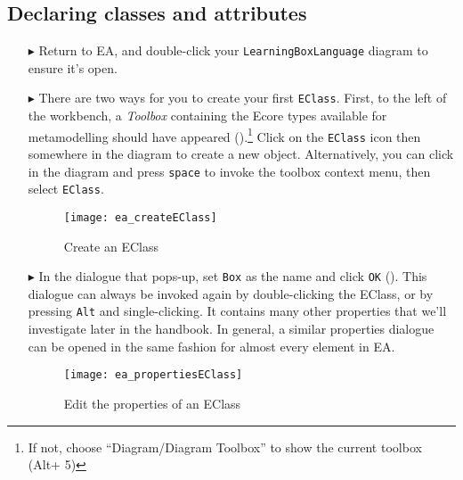 \newpage
\subsection{Declaring classes and attributes}
\genHeader
\hypertarget{static:classes vis}{}

\begin{itemize}

\item[$\blacktriangleright$] Return to EA, and double-click your \texttt{LearningBoxLanguage} diagram to ensure it's open.

\vspace{0.5cm}

\item[$\blacktriangleright$] There are two ways for you to create your first \texttt{EClass}. First, to the left of the workbench, a \emph{Toolbox} containing
the Ecore types available for metamodelling should have appeared ().\footnote{If not, choose ``Diagram/Diagram Toolbox'' to show the
current toolbox (Alt+ 5)} Click on the \texttt{EClass} icon then somewhere in the diagram to create a new object. Alternatively, you can click in the diagram and press
\texttt{space} to invoke the toolbox context menu, then select \texttt{EClass}.

\vspace{0.5cm}

\begin{figure}[htbp]
	\centering
  \texttt{[image: ea\_createEClass]}
	\caption{Create an EClass}
	\label{ea:eclass}
\end{figure}

\vspace{0.5cm}

\item[$\blacktriangleright$] In the dialogue that pops-up, set \texttt{Box} as the name and click \texttt{OK} ().
This dialogue can always be invoked again by double-clicking the EClass, or by pressing \texttt{Alt} and single-clicking. It contains many other properties that we'll investigate later in the handbook. In general, a similar properties dialogue can be opened in the same fashion for almost every element in EA.

\clearpage

\begin{figure}[ht]
	\centering
  \texttt{[image: ea\_propertiesEClass]}
	\caption{Edit the properties of an EClass}
	\label{ea:eclass_properties}
\end{figure}


\end{itemize}

